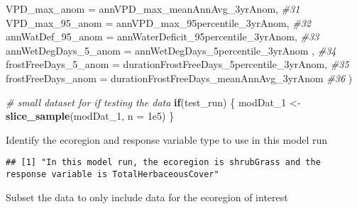 \documentclass[
]{article}
\newenvironment{Shaded}{\begin{snugshade}}{\end{snugshade}}
\newcommand{\AttributeTok}[1]{\textcolor[rgb]{0.13,0.29,0.53}{#1}}
\newcommand{\CommentTok}[1]{\textcolor[rgb]{0.56,0.35,0.01}{\textit{#1}}}
\newcommand{\ControlFlowTok}[1]{\textcolor[rgb]{0.13,0.29,0.53}{\textbf{#1}}}
\newcommand{\FloatTok}[1]{\textcolor[rgb]{0.00,0.00,0.81}{#1}}
\newcommand{\FunctionTok}[1]{\textcolor[rgb]{0.13,0.29,0.53}{\textbf{#1}}}
\newcommand{\NormalTok}[1]{#1}
\newcommand{\OtherTok}[1]{\textcolor[rgb]{0.56,0.35,0.01}{#1}}
\newcommand{\SpecialCharTok}[1]{\textcolor[rgb]{0.81,0.36,0.00}{\textbf{#1}}}
\newcommand{\StringTok}[1]{\textcolor[rgb]{0.31,0.60,0.02}{#1}}
\begin{document}
\begin{Shaded}
\begin{Highlighting}[]
      \AttributeTok{VPD\_max\_anom =}\NormalTok{ annVPD\_max\_meanAnnAvg\_3yrAnom,  }\CommentTok{\#31}
     \AttributeTok{VPD\_max\_95\_anom =}\NormalTok{ annVPD\_max\_95percentile\_3yrAnom, }\CommentTok{\#32}
      \AttributeTok{annWatDef\_95\_anom =}\NormalTok{ annWaterDeficit\_95percentile\_3yrAnom, }\CommentTok{\#33 }
      \AttributeTok{annWetDegDays\_5\_anom =}\NormalTok{ annWetDegDays\_5percentile\_3yrAnom ,  }\CommentTok{\#34}
    \AttributeTok{frostFreeDays\_5\_anom =}\NormalTok{ durationFrostFreeDays\_5percentile\_3yrAnom, }\CommentTok{\#35 }
      \AttributeTok{frostFreeDays\_anom =}\NormalTok{ durationFrostFreeDays\_meanAnnAvg\_3yrAnom }\CommentTok{\#36}
\NormalTok{  )}

\CommentTok{\# small dataset for if testing the data}
\ControlFlowTok{if}\NormalTok{(test\_run) \{}
\NormalTok{  modDat\_1 }\OtherTok{\textless{}{-}} \FunctionTok{slice\_sample}\NormalTok{(modDat\_1, }\AttributeTok{n =} \FloatTok{1e5}\NormalTok{)}
\NormalTok{\}}
\end{Highlighting}
\end{Shaded}

Identify the ecoregion and response variable type to use in this model
run

\begin{Shaded}
\end{Shaded}

\begin{verbatim}
## [1] "In this model run, the ecoregion is shrubGrass and the response variable is TotalHerbaceousCover"
\end{verbatim}

Subset the data to only include data for the ecoregion of interest
\end{document}
